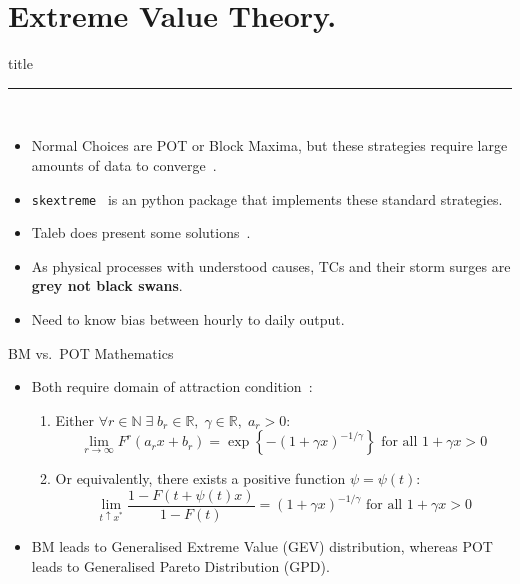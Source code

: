 \section{Extreme Value Theory. }
\begin{frame}[plain]
        \vfill
      \centering
      \begin{beamercolorbox}[sep=8pt,center,shadow=true,rounded=true]{title}
        \insertsectionhead\par%
        \color{oxfordblue}\noindent\rule{10cm}{1pt} \\
        \begin{itemize}
        \item Normal Choices are POT or Block Maxima, but these strategies require
              large amounts of data to converge~\cite{taleb2019much}.
        \item \texttt{skextreme}~\cite{skextremes} is an python package that implements these
              standard strategies.
        \item Taleb does present some solutions~\cite{taleb2019statistical}.
        \item As physical processes with understood causes, TCs
              and their storm surges are \textbf{grey not black swans}.
        \item Need to know bias between hourly to daily output.
        \end{itemize}
      \end{beamercolorbox}
      \vfills
\end{frame}


\begin{frame}{BM vs.\ POT Mathematics}
\begin{itemize}
  \item Both require domain of attraction condition~\cite{bucher2018horse}:

  \begin{enumerate}
    \item Either $\forall r \in \mathbb{N} \;\exists \;b_r \in \mathbb{R},\; \gamma\in \mathbb{R},\; a_r>0: $
      \begin{equation}
      \lim _{r \rightarrow \infty} F^{r}\left(a_{r} x+b_{r}\right)=\exp \left\{-(1+\gamma x)^{-1 / \gamma}\right\} \text { for all } 1+\gamma x>0
      \tag{BM}
      \end{equation}

    \item Or equivalently, there exists a positive function $\psi=\psi (t):$
      \begin{equation}
      \lim _{t \uparrow x^{*}} \frac{1-F(t+\psi(t) x)}{1-F(t)}=(1+\gamma x)^{-1 / \gamma} \text { for all } 1+\gamma x>0
      \tag{POT}
      \end{equation}
   \end{enumerate}

   \item BM leads to Generalised Extreme Value (GEV) distribution,
         whereas POT leads to Generalised Pareto Distribution (GPD).

\end{itemize}
\end{frame}

